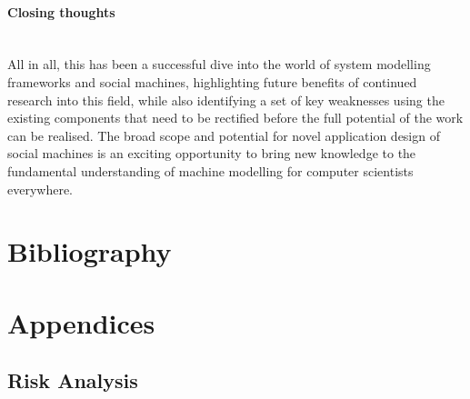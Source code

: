 \documentclass[12pt]{article}
\begin{document}
	\paragraph{Closing thoughts}\hfill\\
		All in all, this has been a successful dive into the world of system modelling frameworks and social machines, highlighting future benefits of continued research into this field, while also identifying a set of key weaknesses using the existing components that need to be rectified before the full potential of the work can be realised.
		The broad scope and potential for novel application design of social machines is an exciting opportunity to bring new knowledge to the fundamental understanding of machine modelling for computer scientists everywhere.
	
	\newpage
	\section{Bibliography}\label{secBib}
	
	
	\newpage
	\appendix
	\section{Appendices}\label{secApp}
	\subsection{Risk Analysis}
	\label{sec:app}
	
\end{document}
